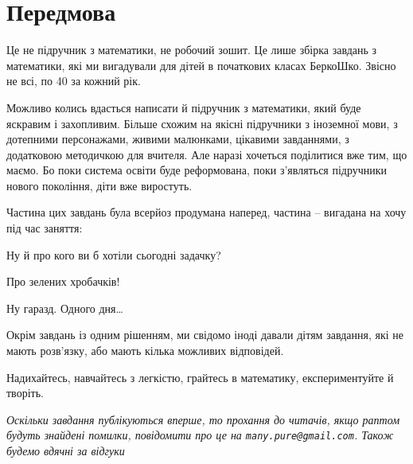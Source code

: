 \chapter*{Передмова}

Це не підручник з математики, не робочий зошит.
Це лише збірка завдань з математики, які ми вигадували для дітей
в початкових класах БеркоШко.
Звісно не всі, по 40 за кожний рік.

Можливо колись вдасться написати й підручник з математики,
який буде яскравим і захопливим.
Більше схожим на якісні підручники з іноземної мови, з дотепними персонажами,
живими малюнками, цікавими завданнями, з додатковою методичкою для вчителя.
Але наразі хочеться поділитися вже тим, що маємо.
Бо поки система освіти буде реформована, поки з’являться підручники
нового покоління, діти вже виростуть.

Частина цих завдань була всерйоз продумана наперед,
частина – вигадана на хочу під час заняття:
\begin{dialogue}
\item Ну й про кого ви б хотіли сьогодні задачку?
\item Про зелених хробачків!
\item Ну гаразд. Одного дня\ldots
\end{dialogue}

Окрім завдань із одним рішенням, ми свідомо іноді давали дітям завдання,
які не мають розв’язку, або мають кілька можливих відповідей.

Надихайтесь, навчайтесь з легкістю, грайтесь в математику,
експериментуйте й творіть. \smiley

\medskip

{ \emph{Оскільки завдання публікуються вперше, то прохання до читачів,
якщо раптом будуть знайдені помилки,
повідомити про це на \emph{\texttt{many.pure@gmail.com}}.
Також будемо вдячні за відгуки}} \smiley
